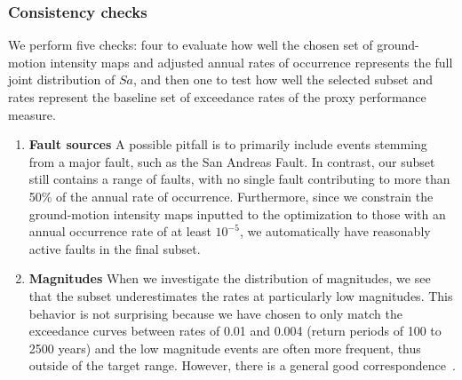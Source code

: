 \subsubsection{Consistency checks}
We perform five checks: four  to evaluate how well the chosen set of ground-motion intensity maps and adjusted annual rates of occurrence represents the full joint distribution of $Sa$, and then one to test how well the selected subset and rates represent the baseline set of exceedance rates of the proxy performance measure.

\begin{enumerate}
\item \textbf{Fault sources} A possible pitfall is to primarily include events stemming from a major fault, such as the San Andreas Fault. In contrast, our subset still contains a range of faults, with no single fault contributing to more than 50\% of the annual rate of occurrence. Furthermore, since we constrain the ground-motion intensity maps inputted to the optimization to those with an annual occurrence rate of at least $10^{-5}$, we automatically have reasonably active faults in the final subset. 
\item \textbf{Magnitudes}  When we investigate the distribution of magnitudes, we see that the subset underestimates the rates at particularly low magnitudes. This behavior is not surprising because we have chosen to only match the exceedance curves between rates of 0.01 and 0.004 (return periods of 100 to 2500 years) and the low magnitude events are often more frequent, thus outside of the target range. However, there is a general good correspondence~\cite{miller_framework_2014}.


\end{enumerate}

